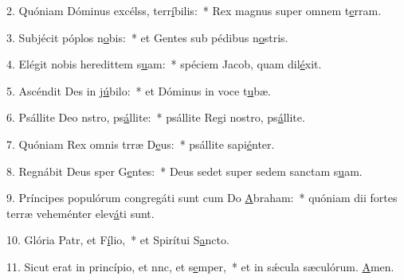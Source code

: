 2. Quóniam Dóminus excélss, terr\uline{í}bilis:~* Rex magnus super omnem t\uline{e}rram.\par 
3. Subjécit póplos n\uline{o}bis:~* et Gentes sub pédibus n\uline{o}stris.\par 
4. Elégit nobis heredittem s\uline{u}am:~* spéciem Jacob, quam dil\uline{é}xit.\par 
5. Ascéndit Des in j\uline{ú}bilo:~* et Dóminus in voce t\uline{u}bæ.\par 
6. Psállite Deo nstro, ps\uline{á}llite:~* psállite Regi nostro, ps\uline{á}llite.\par 
7. Quóniam Rex omnis trræ D\uline{e}us:~* psállite sapi\uline{é}nter.\par 
8. Regnábit Deus sper G\uline{e}ntes:~* Deus sedet super sedem sanctam s\uline{u}am.\par 
9. Príncipes populórum congregáti sunt cum Do \uline{A}braham:~* quóniam dii fortes terræ veheménter elev\uline{á}ti sunt.\par 
10. Glória Patr, et F\uline{í}lio,~* et Spirítui S\uline{a}ncto.\par 
11. Sicut erat in princípio, et nnc, et s\uline{e}mper,~* et in sǽcula sæculórum. \uline{A}men.\par 
